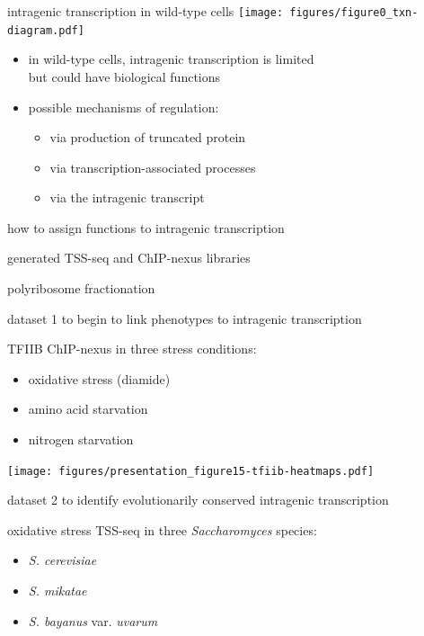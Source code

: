 \documentclass[aspectratio=169]{beamer}
\begin{document}
\begin{frame}{intragenic transcription in wild-type cells}
    \centering
    \texttt{[image: figures/figure0\_txn-diagram.pdf]}
    \begin{itemize}
        \item in wild-type cells, intragenic transcription is limited\\but could have biological functions
        \item possible mechanisms of regulation:
            \begin{itemize}
                \item via production of truncated protein
                \item via transcription-associated processes
                \item via the intragenic transcript
            \end{itemize}
    \end{itemize}
\end{frame}

\begin{frame}{how to assign functions to intragenic transcription}
    \begin{description}[align=right, noitemsep]
        \item [Steve Doris] generated TSS-seq and ChIP-nexus libraries
        \item [Dan Spatt] polyribosome fractionation
    \end{description}
\end{frame}

\begin{frame}{dataset 1}
    to begin to link phenotypes to intragenic transcription
    \vspace{2em}

    TFIIB ChIP-nexus in three stress conditions:
    \begin{itemize}
        \item oxidative stress (diamide)
        \item amino acid starvation
        \item nitrogen starvation
    \end{itemize}
\end{frame}

\begin{frame}
\texttt{[image: figures/presentation\_figure15-tfiib-heatmaps.pdf]}
\end{frame}

\begin{frame}{dataset 2}
    to identify evolutionarily conserved intragenic transcription
    \vspace{2em}

    oxidative stress TSS-seq in three \textit{Saccharomyces} species:
    \begin{itemize}
        \item \textit{S. cerevisiae}
        \item \textit{S. mikatae}
        \item \textit{S. bayanus} var. \textit{uvarum}
    \end{itemize}
\end{frame}
\end{document}
